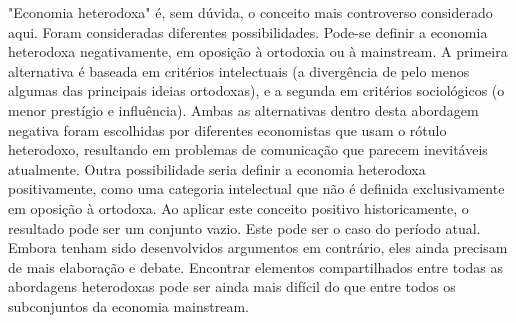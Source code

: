 \documentclass[12pt]{article}
\begin{document}
"Economia heterodoxa" é, sem dúvida, o conceito mais controverso considerado aqui. Foram consideradas diferentes possibilidades. Pode-se definir a economia heterodoxa negativamente, em oposição à ortodoxia ou à mainstream. A primeira alternativa é baseada em critérios intelectuais (a divergência de pelo menos algumas das principais ideias ortodoxas), e a segunda em critérios sociológicos (o menor prestígio e influência). Ambas as alternativas dentro desta abordagem negativa foram escolhidas por diferentes economistas que usam o rótulo heterodoxo, resultando em problemas de comunicação que parecem inevitáveis atualmente. Outra possibilidade seria definir a economia heterodoxa positivamente, como uma categoria intelectual que não é definida exclusivamente em oposição à ortodoxa. Ao aplicar este conceito positivo historicamente, o resultado pode ser um conjunto vazio. Este pode ser o caso do período atual. Embora tenham sido desenvolvidos argumentos em contrário, eles ainda precisam de mais elaboração e debate. Encontrar elementos compartilhados entre todas as abordagens heterodoxas pode ser ainda mais difícil do que entre todos os subconjuntos da economia mainstream.
\end{document}
